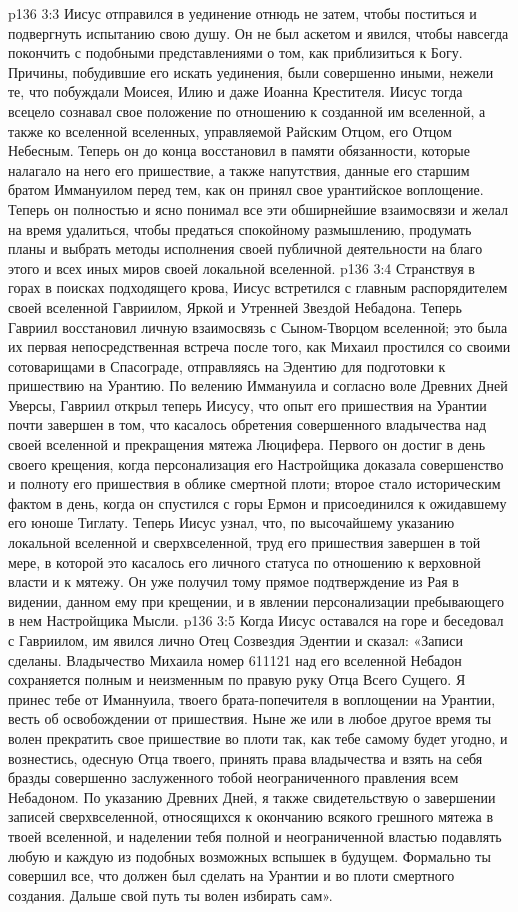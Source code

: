 \vs p136 3:3 Иисус отправился в уединение отнюдь не затем, чтобы поститься и подвергнуть испытанию свою душу. Он не был аскетом и явился, чтобы навсегда покончить с подобными представлениями о том, как приблизиться к Богу. Причины, побудившие его искать уединения, были совершенно иными, нежели те, что побуждали Моисея, Илию и даже Иоанна Крестителя. Иисус тогда всецело сознавал свое положение по отношению к созданной им вселенной, а также ко вселенной вселенных, управляемой Райским Отцом, его Отцом Небесным. Теперь он до конца восстановил в памяти обязанности, которые налагало на него его пришествие, а также напутствия, данные его старшим братом Иммануилом перед тем, как он принял свое урантийское воплощение. Теперь он полностью и ясно понимал все эти обширнейшие взаимосвязи и желал на время удалиться, чтобы предаться спокойному размышлению, продумать планы и выбрать методы исполнения своей публичной деятельности на благо этого и всех иных миров своей локальной вселенной.
\vs p136 3:4 \pc Странствуя в горах в поисках подходящего крова, Иисус встретился с главным распорядителем своей вселенной Гавриилом, Яркой и Утренней Звездой Небадона. Теперь Гавриил восстановил личную взаимосвязь с Сыном\hyp{}Творцом вселенной; это была их первая непосредственная встреча после того, как Михаил простился со своими сотоварищами в Спасограде, отправляясь на Эдентию для подготовки к пришествию на Урантию. По велению Иммануила и согласно воле Древних Дней Уверсы, Гавриил открыл теперь Иисусу, что опыт его пришествия на Урантии почти завершен в том, что касалось обретения совершенного владычества над своей вселенной и прекращения мятежа Люцифера. Первого он достиг в день своего крещения, когда персонализация его Настройщика доказала совершенство и полноту его пришествия в облике смертной плоти; второе стало историческим фактом в день, когда он спустился с горы Ермон и присоединился к ожидавшему его юноше Тиглату. Теперь Иисус узнал, что, по высочайшему указанию локальной вселенной и сверхвселенной, труд его пришествия завершен в той мере, в которой это касалось его личного статуса по отношению к верховной власти и к мятежу. Он уже получил тому прямое подтверждение из Рая в видении, данном ему при крещении, и в явлении персонализации пребывающего в нем Настройщика Мысли.
\vs p136 3:5 Когда Иисус оставался на горе и беседовал с Гавриилом, им явился лично Отец Созвездия Эдентии и сказал: «Записи сделаны. Владычество Михаила номер 611121 над его вселенной Небадон сохраняется полным и неизменным по правую руку Отца Всего Сущего. Я принес тебе от Иманнуила, твоего брата\hyp{}попечителя в воплощении на Урантии, весть об освобождении от пришествия. Ныне же или в любое другое время ты волен прекратить свое пришествие во плоти так, как тебе самому будет угодно, и вознестись, одесную Отца твоего, принять права владычества и взять на себя бразды совершенно заслуженного тобой неограниченного правления всем Небадоном. По указанию Древних Дней, я также свидетельствую о завершении записей сверхвселенной, относящихся к окончанию всякого грешного мятежа в твоей вселенной, и наделении тебя полной и неограниченной властью подавлять любую и каждую из подобных возможных вспышек в будущем. Формально ты совершил все, что должен был сделать на Урантии и во плоти смертного создания. Дальше свой путь ты волен избирать сам».
